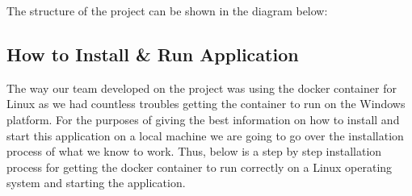 \documentclass[draftclsnofoot,10pt,onecolumn]{IEEEtran} %
\begin{document}
The structure of the project can be shown in the diagram below:



\subsection{How to Install \& Run Application}

The way our team developed on the project was using the docker container for Linux as we had countless troubles getting the container to run on the Windows platform. For the purposes of giving the best information on how to install and start this application on a local machine we are going to go over the installation process of what we know to work. Thus, below is a step by step installation process for getting the docker container to run correctly on a Linux operating system and starting the application. \\
\end{document}

